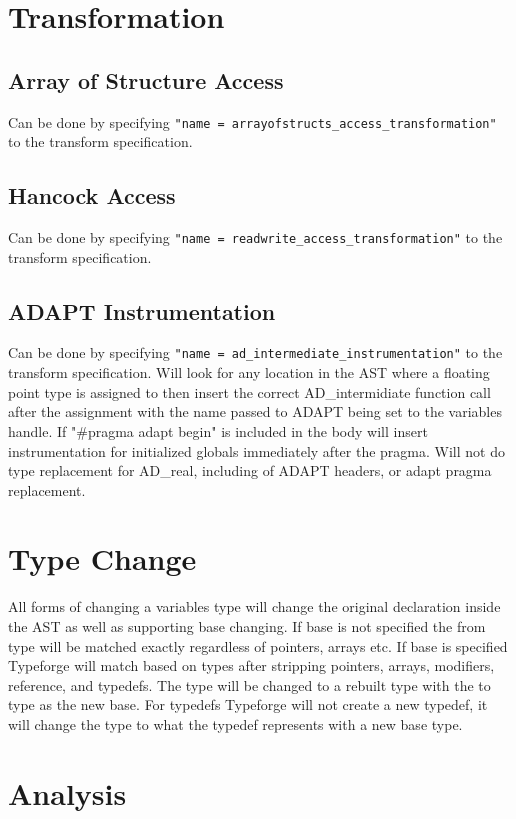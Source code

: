 \documentclass[natbib]{article}
\begin{document}
\section{Transformation} \label{transform}
\subsection{Array of Structure Access}
Can be done by specifying \verb+"name = arrayofstructs_access_transformation"+ to the transform 
specification.
\subsection{Hancock Access}
Can be done by specifying \verb+"name = readwrite_access_transformation"+ to the transform 
specification.
\subsection{ADAPT Instrumentation}
Can be done by specifying \verb+"name = ad_intermediate_instrumentation"+ to the transform 
specification. Will look for any location in the AST where a floating point type is assigned 
to then insert the correct AD\_intermidiate function call after the assignment with the name 
passed to ADAPT being set to the variables handle. If "\#pragma adapt begin" is included in 
the body will insert instrumentation for initialized globals immediately after the pragma. 
Will not do type replacement for AD\_real, including of ADAPT headers, or adapt pragma replacement.

\section{Type Change} \label{change}
All forms of changing a variables type will change the original declaration inside the AST 
as well as supporting base changing. If base is not specified the from type will be matched 
exactly regardless of pointers, arrays etc. If base is specified Typeforge will match based 
on types after stripping pointers, arrays, modifiers, reference, and typedefs. The type will 
be changed to a rebuilt type with the to type as the new base. For typedefs Typeforge will 
not create a new typedef, it will change the type to what the typedef represents with a 
new base type.

\section{Analysis} \label{analysis}
\end{document}
